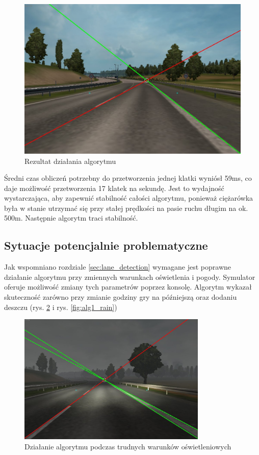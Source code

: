 \begin{figure}
  \centering
  \includegraphics[width=13cm]{img/alg1_res.jpg}
  \caption{Rezultat działania algorytmu}
  \label{fig:alg1_res}
\end{figure}

Średni czas obliczeń potrzebny do przetworzenia jednej klatki wyniósł 59ms, co daje możliwość przetworzenia 17 klatek na sekundę. 
Jest to wydajność wystarczająca, aby zapewnić stabilność całości algorytmu, ponieważ ciężarówka była w stanie utrzymać się przy stałej prędkości na pasie ruchu długim na ok. 500m. Następnie algorytm traci stabilność.

\subsection{Sytuacje potencjalnie problematyczne}
Jak wspomniano rozdziale \ref{sec:lane_detection} wymagane jest poprawne działanie algorytmu przy zmiennych warunkach oświetlenia i pogody. %
Symulator oferuje możliwość zmiany tych parametrów poprzez konsolę. 
Algorytm wykazał skuteczność zarówno przy zmianie godziny gry na późniejszą oraz dodaniu deszczu (rys. \ref{fig:alg1_late} i rys. \ref{fig:alg1_rain})

\begin{figure}
  \centering
  \includegraphics[width=9cm]{img/alg1_late.jpg}
  \caption{Działanie algorytmu podczas trudnych warunków oświetleniowych}
  \label{fig:alg1_late}
\end{figure}

